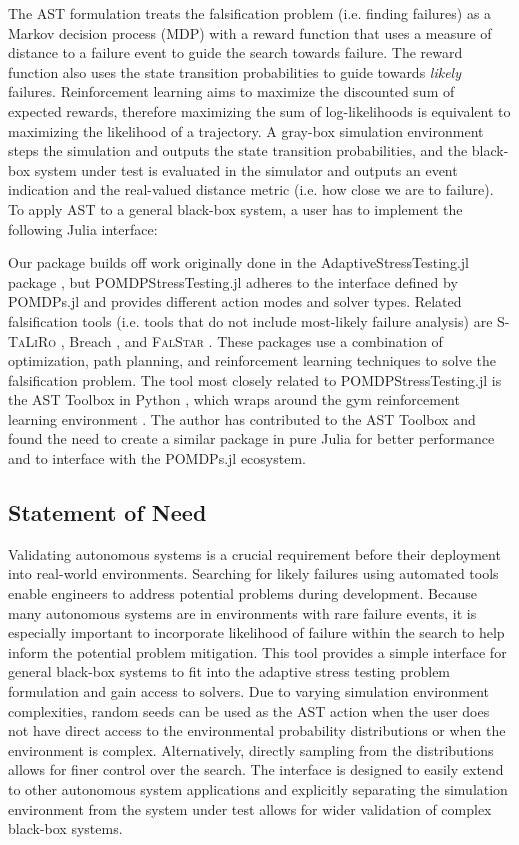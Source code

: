 The AST formulation treats the falsification problem (i.e. finding failures) as a Markov decision process (MDP) with a reward function that uses a measure of distance to a failure event to guide the search towards failure.
The reward function also uses the state transition probabilities to guide towards \textit{likely} failures.
Reinforcement learning aims to maximize the discounted sum of expected rewards, therefore maximizing the sum of log-likelihoods is equivalent to maximizing the likelihood of a trajectory.
A gray-box simulation environment steps the simulation and outputs the state transition probabilities, and the black-box system under test is evaluated in the simulator and outputs an event indication and the real-valued distance metric (i.e. how close we are to failure).
To apply AST to a general black-box system, a user has to implement the following Julia interface:


Our package builds off work originally done in the AdaptiveStressTesting.jl package \cite{ast}, but POMDPStressTesting.jl adheres to the interface defined by POMDPs.jl and provides different action modes and solver types.
Related falsification tools (i.e. tools that do not include most-likely failure analysis) are \textsc{S-TaLiRo} \cite{staliro}, Breach \cite{breach}, and \textsc{FalStar} \cite{falstar}.
These packages use a combination of optimization, path planning, and reinforcement learning techniques to solve the falsification problem.
The tool most closely related to POMDPStressTesting.jl is the AST Toolbox in Python \cite{ast_av}, which wraps around the gym reinforcement learning environment \cite{gym}.
The author has contributed to the AST Toolbox and found the need to create a similar package in pure Julia for better performance and to interface with the POMDPs.jl ecosystem.


\subsection{Statement of Need}

Validating autonomous systems is a crucial requirement before their deployment into real-world environments.
Searching for likely failures using automated tools enable engineers to address potential problems during development.
Because many autonomous systems are in environments with rare failure events, it is especially important to incorporate likelihood of failure within the search to help inform the potential problem mitigation.
This tool provides a simple interface for general black-box systems to fit into the adaptive stress testing problem formulation and gain access to solvers.
Due to varying simulation environment complexities, random seeds can be used as the AST action when the user does not have direct access to the environmental probability distributions or when the environment is complex.
Alternatively, directly sampling from the distributions allows for finer control over the search.
The interface is designed to easily extend to other autonomous system applications and explicitly separating the simulation environment from the system under test allows for wider validation of complex black-box systems.




